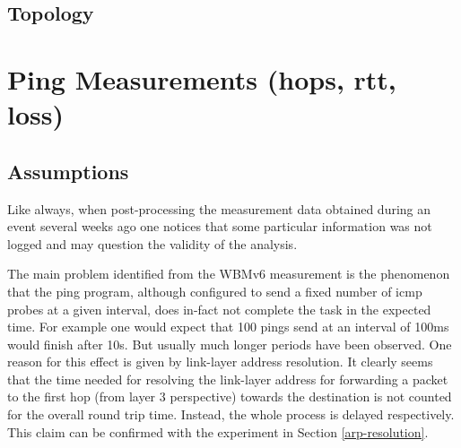 \documentclass[a4paper,12pt,twoside]{article}
\begin{document}
\subsection{Topology}





%

\clearpage

\section{Ping Measurements (hops, rtt, loss)}
\label{sec:ping-measurements}

\subsection{Assumptions}

Like always, when post-processing the measurement data obtained during
an event several weeks ago one notices that some particular
information was not logged and may question the validity of the
analysis. 

The main problem identified from the WBMv6 measurement is the
phenomenon that the ping program, although configured to send a fixed
number of icmp probes at a given interval, does in-fact not complete
the task in the expected time.  For example one would expect that 100
pings send at an interval of 100ms would finish after 10s. But usually
much longer periods have been observed. One reason for this effect is
given by link-layer address resolution. It clearly seems that the time
needed for resolving the link-layer address for forwarding a packet to
the first hop (from layer 3 perspective) towards the destination is
not counted for the overall round trip time. Instead, the whole
process is delayed respectively. This claim can be confirmed with the
experiment in Section \ref{arp-resolution}.
\end{document}
